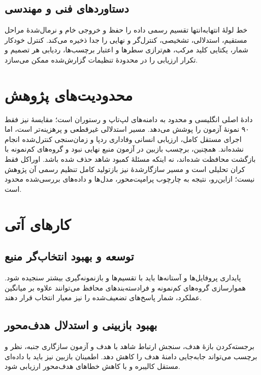 \subsection{دستاوردهای فنی و مهندسی}

خط لولۀ انتهابه‌انتها تقسیم رسمی داده را حفظ و خروجی خام و نرمال‌شدۀ مراحل مستقیم، استدلالی، تشخیصی، کنترل‌گر و نهایی را جدا ذخیره می‌کند. کنترل خودکار شمار، یکتایی کلید مرکب، هم‌ترازی سطرها و اعتبار برچسب‌ها، ردیابی هر تصمیم و تکرار ارزیابی را در محدودۀ تنظیمات گزارش‌شده ممکن می‌سازد.

\section{محدودیت‌های پژوهش}

دادۀ اصلی انگلیسی و محدود به دامنه‌های لپ‌تاپ و رستوران است؛ مقایسۀ  نیز فقط ۹۰ نمونۀ آزمون را پوشش می‌دهد. مسیر استدلالی غیرقطعی و پرهزینه‌تر است، اما اجرای مستقل کامل، ارزیابی انسانی وفاداری ردپا و زمان‌سنجی کنترل‌شده انجام نشده‌اند. همچنین، برچسب بازبین در آزمون منبع نهایی نبود و گروه‌های کم‌نمونه با بازگشت محافظت شده‌اند، نه اینکه مسئلۀ کمبود شاهد حذف شده باشد. اوراکل فقط کران تحلیلی است و مسیر سازگارشدۀ  نیز بازتولید کامل تنظیم رسمی آن پژوهش نیست؛ ازاین‌رو، نتیجه به چارچوب پرامپت‌محور، مدل‌ها و داده‌های بررسی‌شده محدود است.

\section{کارهای آتی}

\subsection{توسعه و بهبود انتخاب‌گر منبع}

پایداری پروفایل‌ها و آستانه‌ها باید با تقسیم‌ها و بازنمونه‌گیری بیشتر سنجیده شود. هموارسازی گروه‌های کم‌نمونه و فرادسته‌بندهای محافظ می‌توانند علاوه بر میانگین عملکرد، شمار پاسخ‌های تضعیف‌شده را نیز معیار انتخاب قرار دهند.

\subsection{بهبود بازبینی و استدلال هدف‌محور}

برجسته‌کردن بازۀ هدف، سنجش ارتباط شاهد با هدف و آزمون سازگاری جنبه، نظر و برچسب می‌تواند جابه‌جایی دامنۀ هدف را کاهش دهد. اطمینان بازبین نیز باید با داده‌ای مستقل کالیبره و با کاهش خطاهای هدف‌محور ارزیابی شود.

